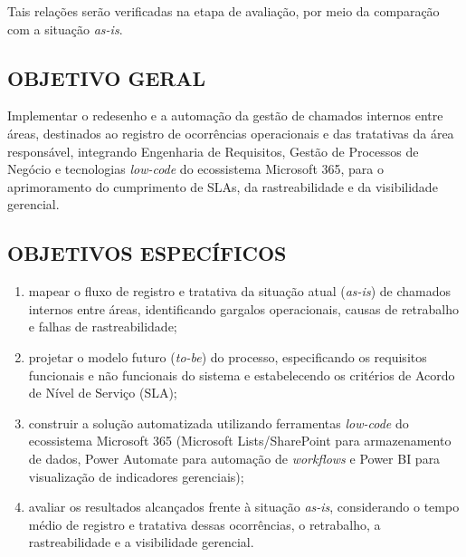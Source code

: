 Tais relações serão verificadas na etapa de avaliação, por meio da comparação com a situação
  \textit{as-is}.
 
\subsection{OBJETIVO GERAL}
 
Implementar o redesenho e a automação da gestão de chamados internos entre áreas, destinados ao
  registro de ocorrências operacionais e das tratativas da área responsável, integrando Engenharia
  de Requisitos, Gestão de Processos de Negócio e tecnologias \textit{low-code} do ecossistema
  Microsoft 365, para o aprimoramento do cumprimento de SLAs, da rastreabilidade e da visibilidade
  gerencial.
 
\subsection{OBJETIVOS ESPECÍFICOS}
 
{\renewcommand{\labelenumi}{\alph{enumi})}
\begin{enumerate}
  \item mapear o fluxo de registro e tratativa da situação atual (\textit{as-is}) de chamados
      internos entre áreas, identificando gargalos operacionais, causas de retrabalho e falhas de
      rastreabilidade;
  \item projetar o modelo futuro (\textit{to-be}) do processo, especificando os requisitos
      funcionais e não funcionais do sistema e estabelecendo os critérios de Acordo de Nível de
      Serviço (SLA);
  \item construir a solução automatizada utilizando ferramentas \textit{low-code} do ecossistema
      Microsoft 365 (Microsoft Lists/SharePoint para armazenamento de dados, Power Automate para
      automação de \textit{workflows} e Power BI para visualização de indicadores gerenciais);
  \item avaliar os resultados alcançados frente à situação \textit{as-is}, considerando o tempo
      médio de registro e tratativa dessas ocorrências, o retrabalho, a rastreabilidade e a
      visibilidade gerencial.
\end{enumerate}}